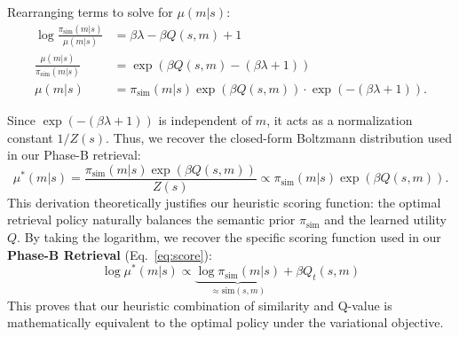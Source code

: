 \documentclass{article}
\theoremstyle{plain}
\theoremstyle{definition}
\theoremstyle{remark}
\begin{document}
Rearranging terms to solve for $\mu(m|s)$:
\begin{equation*}
\begin{aligned}
\log \frac{\pi_{\text{sim}}(m|s)}{\mu(m|s)} &= \beta \lambda - \beta Q(s, m) + 1 \\
\frac{\mu(m|s)}{\pi_{\text{sim}}(m|s)} &= \exp\left( \beta Q(s, m) - (\beta \lambda + 1) \right) \\
\mu(m|s) &= \pi_{\text{sim}}(m|s) \exp(\beta Q(s, m)) \cdot \exp(-(\beta \lambda + 1)).
\end{aligned}
\end{equation*}

Since $\exp(-(\beta \lambda + 1))$ is independent of $m$, it acts as a normalization constant $1/Z(s)$. Thus, we recover the closed-form Boltzmann distribution used in our Phase-B retrieval:
\begin{equation*}
\mu^*(m|s) = \frac{\pi_{\text{sim}}(m|s) \exp(\beta Q(s, m))}{Z(s)} \propto \pi_{\text{sim}}(m|s) \exp(\beta Q(s, m)).
\end{equation*}
This derivation theoretically justifies our heuristic scoring function: the optimal retrieval policy naturally balances the semantic prior $\pi_{\text{sim}}$ and the learned utility $Q$.
By taking the logarithm, we recover the specific scoring function used in our \textbf{Phase-B Retrieval} (Eq.~\ref{eq:score}):
\begin{equation*}
\log \mu^*(m|s) \propto \underbrace{\log \pi_{\text{sim}}(m|s)}_{\approx \text{sim}(s, m)} + \beta Q_t(s, m)
\end{equation*}
This proves that our heuristic combination of similarity and Q-value is mathematically equivalent to the optimal policy under the variational objective.
\end{document}
